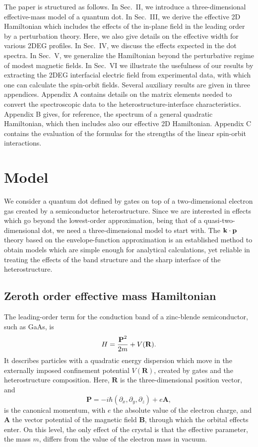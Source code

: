 \documentclass[aps,floatfix,twocolumn,showpacs,10pt,nofootinbib]{revtex4-1}
\newcommand{\be}{\begin{equation}}
\newcommand{\ee}{\end{equation}}
\begin{document}
The paper is structured as follows. In Sec.~II, we introduce a three-dimensional effective-mass model of a quantum dot. In Sec.~III, we derive the effective 2D Hamiltonian which includes the effects of the in-plane field in the leading order by a perturbation theory. Here, we also give details on the effective width for various 2DEG profiles. In Sec.~IV, we discuss the effects expected in the dot spectra. In Sec.~V, we generalize the Hamiltonian beyond the perturbative regime of modest magnetic fields. In Sec.~VI we illustrate the usefulness of our results by extracting the 2DEG interfacial electric field from experimental data, with which one can calculate the spin-orbit fields.
Several auxiliary results are given in three appendices. Appendix A contains details on the matrix elements needed to convert the spectroscopic data to the heterostructure-interface characteristics. Appendix B gives, for reference, the spectrum of a general quadratic Hamiltonian, which then includes also our effective 2D Hamiltonian. Appendix C contains the evaluation of the formulas for the strengths of the linear spin-orbit interactions.


\section{Model}

We consider a quantum dot defined by gates on top of a two-dimensional electron gas created by a semiconductor heterostructure.  Since we are interested in effects which go beyond the lowest-order approximation, being that of a quasi-two-dimensional dot, we need a three-dimensional model to start with. The ${\bf k} \cdot {\bf p}$ theory based on the envelope-function approximation is an established method to obtain models which are simple enough for analytical calculations, yet reliable in treating the effects of the band structure and the sharp interface of the heterostructure.

\subsection{Zeroth order effective mass Hamiltonian}

\label{sec:notations}

The leading-order term for the conduction band of a zinc-blende semiconductor, such as GaAs, is
\be
H=\frac{ \textbf{P}^2 }{2m} + V({\bf R}).
\label{eq:H zeroth order}
\ee
It describes particles with a quadratic energy dispersion which move in the externally imposed confinement potential $V(\textbf{R})$, created by gates and the heterostructure composition. Here, $\textbf{R}$ is the three-dimensional position vector, and
\be
\textbf{P} = -i\hbar (\partial_x, \partial_y, \partial_z) + e\textbf{A},
\ee
is the canonical momentum, with $e$ the absolute value of the electron charge, and $\textbf{A}$ the vector potential of the magnetic field $\textbf{B}$, through which the orbital effects enter. On this level, the only effect of the crystal is that the effective parameter, the mass $m$, differs from the value of the electron mass in vacuum.
\end{document}
